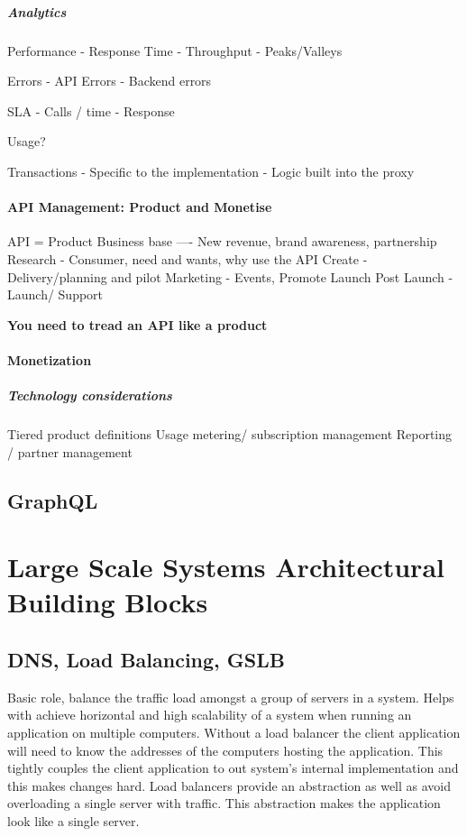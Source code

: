 \documentclass[a4paper, 11pt]{book}
\begin{document}
    \paragraph{Analytics}
    Performance
    - Response Time
    - Throughput
    - Peaks/Valleys

    Errors
    - API Errors
    - Backend errors

    SLA
    - Calls / time
    - Response

    Usage?

    Transactions
    - Specific to the implementation
    - Logic built into the proxy

    \subsubsection{API Management: Product and Monetise}
    API = Product
    Business base ---- New revenue, brand awareness, partnership
    Research - Consumer, need and wants, why use the API
    Create - Delivery/planning and pilot
    Marketing - Events, Promote
    Launch Post Launch - Launch/ Support

    \textbf{You need to tread an API like a product}

    \subsubsection{Monetization}

    \paragraph{Technology considerations}
    Tiered product definitions
    Usage metering/ subscription management
    Reporting / partner management

    \section{GraphQL}

    

    \chapter{Large Scale Systems Architectural Building Blocks}

    \section{DNS, Load Balancing, GSLB}
    Basic role, balance the traffic load amongst a group of servers in a system.
    Helps with achieve horizontal and high scalability of a system when running an application on multiple computers.
    Without a load balancer the client application will need to know the addresses of the computers hosting the application.
    This tightly couples the client application to out system's internal implementation and this makes changes hard.
    Load balancers provide an abstraction as well as avoid overloading a single server with traffic.
    This abstraction makes the application look like a single server.
\end{document}
